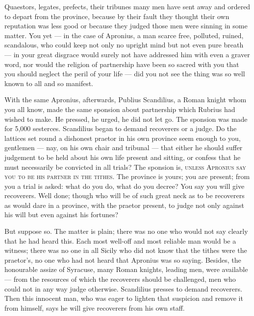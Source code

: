  Quaestors, legates, prefects, their tribunes many men have sent away and ordered to depart from the province, because by their fault they thought their own reputation was less good or because they judged those men were sinning in some matter. You yet --- in the case of Apronius, a man scarce free, polluted, ruined, scandalous, who could keep not only no upright mind but not even pure breath --- in your great disgrace would surely not have addressed him with even a graver word, nor would the religion of partnership have been so sacred with you that you should neglect the peril of your life --- did you not see the thing was so well known to all and so manifest.

 With the same Apronius, afterwards, Publius Scandilius, a Roman knight whom you all know, made the same sponsion about partnership which Rubrius had wished to make. He pressed, he urged, he did not let go. The sponsion was made for 5,000 sesterces. Scandilius began to demand recoverers or a judge. Do the lattices set round a dishonest praetor in his own province seem enough to you, gentlemen --- nay, on his own chair and tribunal --- that either he should suffer judgement to be held about his own life present and sitting, or confess that he must necessarily be convicted in all trials? The sponsion is, \textsc{unless Apronius say you to be his partner in the tithes}. The province is yours; you are present; from you a trial is asked: what do you do, what do you decree? You say you will give recoverers. Well done; though who will be of such great neck as to be recoverers as would dare in a province, with the praetor present, to judge not only against his will but even against his fortunes?

 But suppose so. The matter is plain; there was no one who would not say clearly that he had heard this. Each most well-off and most reliable man would be a witness; there was no one in all Sicily who did not know that the tithes were the praetor's, no one who had not heard that Apronius was so saying. Besides, the honourable assize of Syracuse, many Roman knights, leading men, were available --- from the resources of which the recoverers should be challenged, men who could not in any way judge otherwise. Scandilius presses to demand recoverers. Then this innocent man, who was eager to lighten that suspicion and remove it from himself, says he will give recoverers from his own staff.

